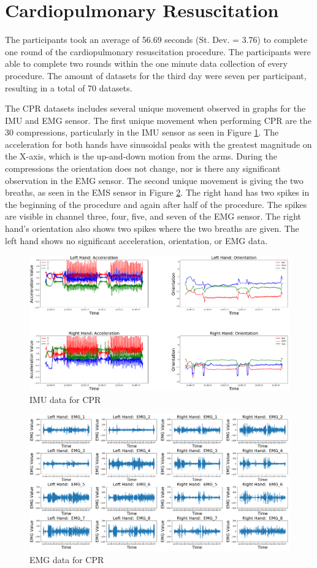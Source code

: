 \section{Cardiopulmonary Resuscitation}
\label{sec:Results:CPR}
The participants took an average of 56.69 seconds (St. Dev. = 3.76) to complete one round of the cardiopulmonary resuscitation procedure. The participants were able to complete two rounds within the one minute data collection of every procedure. The amount of datasets for the third day were seven per participant, resulting in a total of 70 datasets.
\par The CPR datasets includes several unique movement observed in graphs for the IMU and EMG sensor. The first unique movement when performing CPR are the 30 compressions, particularly in the IMU sensor as seen in Figure \ref{fig:1571imuday3cpr31}. The acceleration for both hands have sinusoidal peaks with the greatest magnitude on the X-axis, which is the up-and-down motion from the arms. During the compressions the orientation does not change, nor is there any significant observation in the EMG sensor. The second unique movement is giving the two breaths, as seen in the EMS sensor in Figure \ref{fig:1571emgday3cpr31}. The right hand has two spikes in the beginning of the procedure and again after half of the procedure. The spikes are visible in channel three, four, five, and seven of the EMG sensor. The right hand's orientation also shows two spikes where the two breaths are given. The left hand shows no significant acceleration, orientation, or EMG data.
\begin{figure}
	\centering
	\includegraphics[width=0.8\linewidth]{pictures/1571_IMU_Day3_cpr_31}
	\caption{IMU data for CPR}
	\label{fig:1571imuday3cpr31}
\end{figure}
\begin{figure}
	\centering
	\includegraphics[width=0.8\linewidth]{pictures/1571_EMG_Day3_cpr_31}
	\caption{EMG data for CPR}
	\label{fig:1571emgday3cpr31}
\end{figure}
